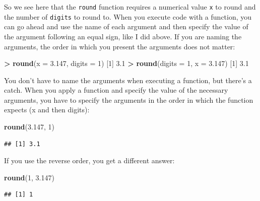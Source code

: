 \documentclass[
]{book}
\newenvironment{Shaded}{\begin{snugshade}}{\end{snugshade}}
\newcommand{\AttributeTok}[1]{\textcolor[rgb]{0.13,0.29,0.53}{#1}}
\newcommand{\DecValTok}[1]{\textcolor[rgb]{0.00,0.00,0.81}{#1}}
\newcommand{\FloatTok}[1]{\textcolor[rgb]{0.00,0.00,0.81}{#1}}
\newcommand{\FunctionTok}[1]{\textcolor[rgb]{0.13,0.29,0.53}{\textbf{#1}}}
\newcommand{\NormalTok}[1]{#1}
\newcommand{\SpecialCharTok}[1]{\textcolor[rgb]{0.81,0.36,0.00}{\textbf{#1}}}
\begin{document}
So we see here that the \texttt{round} function requires a numerical value \texttt{x} to round and the number of \texttt{digits} to round to. When you execute code with a function, you can go ahead and use the name of each argument and then specify the value of the argument following an equal sign, like I did above. If you are naming the arguments, the order in which you present the arguments does not matter:

\begin{Shaded}
\begin{Highlighting}[]
\SpecialCharTok{\textgreater{}} \FunctionTok{round}\NormalTok{(}\AttributeTok{x =} \FloatTok{3.147}\NormalTok{, }\AttributeTok{digits =} \DecValTok{1}\NormalTok{)}
\NormalTok{[}\DecValTok{1}\NormalTok{] }\FloatTok{3.1}
\SpecialCharTok{\textgreater{}} \FunctionTok{round}\NormalTok{(}\AttributeTok{digits =} \DecValTok{1}\NormalTok{, }\AttributeTok{x =} \FloatTok{3.147}\NormalTok{)}
\NormalTok{[}\DecValTok{1}\NormalTok{] }\FloatTok{3.1}
\end{Highlighting}
\end{Shaded}

You don't have to name the arguments when executing a function, but there's a catch. When you apply a function and specify the value of the necessary arguments, you have to specify the arguments in the order in which the function expects (x and then digits):

\begin{Shaded}
\begin{Highlighting}[]
\FunctionTok{round}\NormalTok{(}\FloatTok{3.147}\NormalTok{, }\DecValTok{1}\NormalTok{)}
\end{Highlighting}
\end{Shaded}

\begin{verbatim}
## [1] 3.1
\end{verbatim}

If you use the reverse order, you get a different answer:

\begin{Shaded}
\begin{Highlighting}[]
\FunctionTok{round}\NormalTok{(}\DecValTok{1}\NormalTok{, }\FloatTok{3.147}\NormalTok{)}
\end{Highlighting}
\end{Shaded}

\begin{verbatim}
## [1] 1
\end{verbatim}
\end{document}

